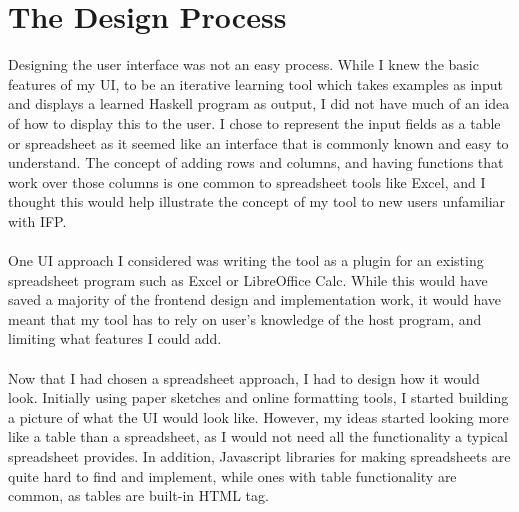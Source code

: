 \section{The Design Process}
Designing the user interface was not an easy process. While I knew the basic features of my UI, to be an iterative learning tool which takes examples as input and displays a learned Haskell program as output, I did not have much of an idea of how to display this to the user. I chose to represent the input fields as a table or spreadsheet as it seemed like an interface that is commonly known and easy to understand. The concept of adding rows and columns, and having functions that work over those columns is one common to spreadsheet tools like Excel, and I thought this would help illustrate the concept of my tool to new users unfamiliar with IFP. \\ \\
One UI approach I considered was writing the tool as a plugin for an existing spreadsheet program such as Excel or LibreOffice Calc. While this would have saved a majority of the frontend design and implementation work, it would have meant that my tool has to rely on user's knowledge of the host program, and limiting what features I could add. \\ \\
Now that I had chosen a spreadsheet approach, I had to design how it would look. Initially using paper sketches and online formatting tools, I started building a picture of what the UI would look like. However, my ideas started looking more like a table than a spreadsheet, as I would not need all the functionality a typical spreadsheet provides. In addition, Javascript libraries for making spreadsheets are quite hard to find and implement, while ones with table functionality are common, as tables are built-in HTML tag.

